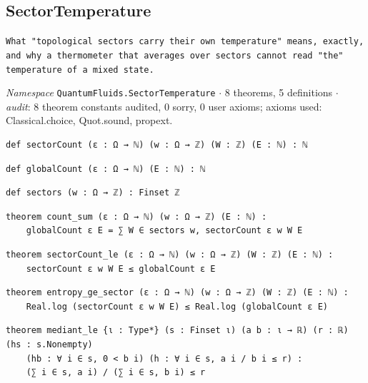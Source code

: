 \subsection{SectorTemperature}\label{appA:SectorTemperature}
{\footnotesize\raggedright\texttt{What "topological sectors carry their own temperature" means,\allowbreak{} exactly,\allowbreak{} and why a thermometer that averages over sectors cannot read "the" temperature of a mixed state.\allowbreak{}}\par}
{\footnotesize\raggedright\emph{Namespace} \texttt{QuantumFluids.\allowbreak{}SectorTemperature} $\cdot$ 8 theorems, 5 definitions $\cdot$ \emph{audit}: 8 theorem constants audited, 0 sorry, 0 user axioms; axioms used: Classical.choice, Quot.sound, propext.\par}
\vspace{1pt}
\begin{lstlisting}[style=leancat]
def sectorCount (ε : Ω → ℕ) (w : Ω → ℤ) (W : ℤ) (E : ℕ) : ℕ
\end{lstlisting}

\begin{lstlisting}[style=leancat]
def globalCount (ε : Ω → ℕ) (E : ℕ) : ℕ
\end{lstlisting}

\begin{lstlisting}[style=leancat]
def sectors (w : Ω → ℤ) : Finset ℤ
\end{lstlisting}

\begin{lstlisting}[style=leancat]
theorem count_sum (ε : Ω → ℕ) (w : Ω → ℤ) (E : ℕ) :
    globalCount ε E = ∑ W ∈ sectors w, sectorCount ε w W E
\end{lstlisting}

\begin{lstlisting}[style=leancat]
theorem sectorCount_le (ε : Ω → ℕ) (w : Ω → ℤ) (W : ℤ) (E : ℕ) :
    sectorCount ε w W E ≤ globalCount ε E
\end{lstlisting}

\begin{lstlisting}[style=leancat]
theorem entropy_ge_sector (ε : Ω → ℕ) (w : Ω → ℤ) (W : ℤ) (E : ℕ) :
    Real.log (sectorCount ε w W E) ≤ Real.log (globalCount ε E)
\end{lstlisting}

\begin{lstlisting}[style=leancat]
theorem mediant_le {ι : Type*} (s : Finset ι) (a b : ι → ℝ) (r : ℝ) (hs : s.Nonempty)
    (hb : ∀ i ∈ s, 0 < b i) (h : ∀ i ∈ s, a i / b i ≤ r) :
    (∑ i ∈ s, a i) / (∑ i ∈ s, b i) ≤ r
\end{lstlisting}


